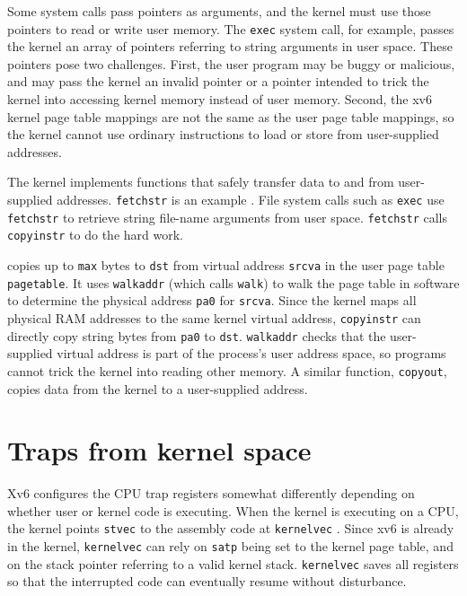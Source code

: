 Some system calls pass pointers as arguments, and the kernel must use
those pointers to read or write user memory. The {\tt exec} system
call, for example, passes the kernel an array of pointers
referring to string arguments in user space.
These pointers pose
two challenges. First, the user program may be buggy or malicious, and
may pass the kernel an invalid pointer or a pointer intended to trick
the kernel into accessing kernel memory instead of user memory.
Second, the xv6 kernel page table mappings are not the same as the
user page table mappings, so the kernel cannot use ordinary
instructions to load or store from user-supplied addresses.

The kernel implements functions that safely transfer data to and
from user-supplied addresses.
{\tt fetchstr} is an example .
File system calls such as
{\tt exec} use {\tt fetchstr} to retrieve string file-name arguments from user
space.
\lstinline{fetchstr} calls \lstinline{copyinstr}
to do the hard work.

 copies up to \lstinline{max} bytes to
\lstinline{dst} from virtual address \lstinline{srcva} in the user page
table \lstinline{pagetable}.  It uses {\tt walkaddr}
(which calls {\tt walk}) to walk the page table in software to
determine the physical address \lstinline{pa0} for \lstinline{srcva}.
Since the kernel maps all physical RAM addresses to the same
kernel virtual address,
{\tt copyinstr} can directly copy string bytes from {\tt pa0} to {\tt dst}.
{\tt walkaddr} 
checks that the user-supplied virtual address is part of
the process's user address space, so programs
cannot trick the kernel into reading other memory.
A similar function, {\tt copyout}, copies data from the
kernel to a user-supplied address.

\section{Traps from kernel space}

Xv6 configures the CPU trap registers somewhat differently depending
on whether user or kernel code is executing.
When the kernel is executing on a CPU, the kernel points {\tt stvec}
to the assembly code at {\tt kernelvec}
.
Since xv6 is already in the kernel, {\tt kernelvec} can rely
on {\tt satp} being set to the kernel page table, and on the
stack pointer referring to a valid kernel stack.
{\tt kernelvec} saves all registers so that the interrupted
code can eventually resume without disturbance.

